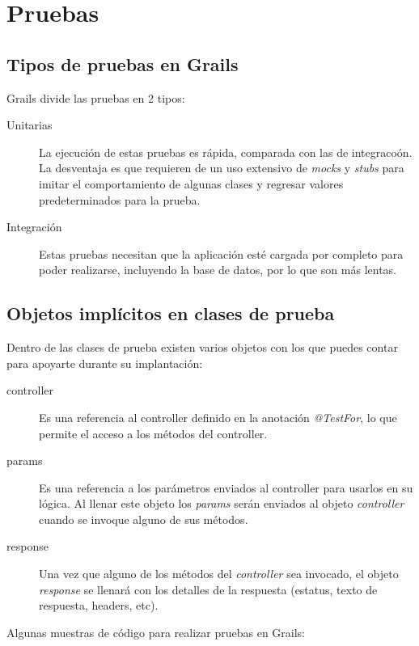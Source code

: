 \chapter{Pruebas}

\section{Tipos de pruebas en Grails}
Grails divide las pruebas en 2 tipos:
\begin{description}
 \item [Unitarias] La ejecuci\'on de estas pruebas es r\'apida, comparada con las de integraco\'on. La desventaja es que requieren de un uso extensivo de \textit{mocks} y \textit{stubs} para imitar el comportamiento de algunas clases y regresar valores predeterminados para la prueba. 
 \item [Integraci\'on] Estas pruebas necesitan que la aplicaci\'on est\'e cargada por completo para poder realizarse, incluyendo la base de datos, por lo que son m\'as lentas. 
\end{description}

\section{Objetos impl\'icitos en clases de prueba}

Dentro de las clases de prueba existen varios objetos con los que puedes contar para apoyarte durante su implantaci\'on:

\begin{description}
 \item [controller] Es una referencia al controller definido en la anotaci\'on \textit{@TestFor}, lo que permite el acceso a los m\'etodos del controller.
 \item [params] Es una referencia a los par\'ametros enviados al controller para usarlos en su l\'ogica. Al llenar este objeto los \textit{params} ser\'an enviados al objeto \textit{controller} cuando se invoque alguno de sus m\'etodos.
 \item [response] Una vez que alguno de los m\'etodos del \textit{controller} sea invocado, el objeto \textit{response} se llenar\'a con los detalles de la respuesta (estatus, texto de respuesta, headers, etc).
\end{description}


Algunas muestras de c\'odigo para realizar pruebas en Grails:

